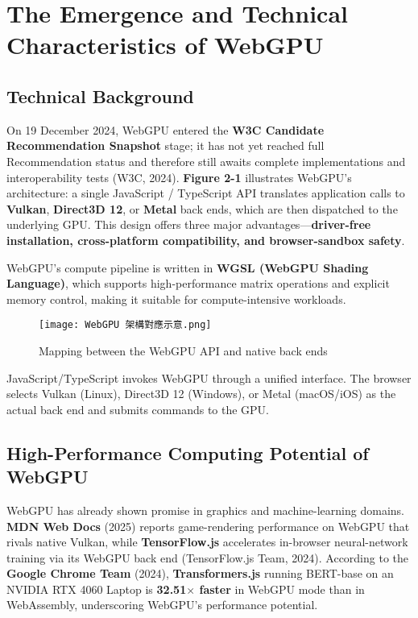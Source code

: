 \documentclass[PhD]{PHlab-thesis}
\begin{document}
\section{The Emergence and Technical Characteristics of WebGPU}
\subsection{Technical Background}
On 19 December 2024, WebGPU entered the \textbf{W3C Candidate Recommendation Snapshot} stage; it has not yet reached full Recommendation status and therefore still awaits complete implementations and interoperability tests (W3C, 2024). \textbf{Figure 2-1} illustrates WebGPU’s architecture: a single JavaScript / TypeScript API translates application calls to \textbf{Vulkan}, \textbf{Direct3D 12}, or \textbf{Metal} back ends, which are then dispatched to the underlying GPU. This design offers three major advantages—\textbf{driver-free installation, cross-platform compatibility, and browser-sandbox safety}.

WebGPU’s compute pipeline is written in \textbf{WGSL (WebGPU Shading Language)}, which supports high-performance matrix operations and explicit memory control, making it suitable for compute-intensive workloads.

\begin{figure}[htbp]
    \centering
    \texttt{[image: WebGPU 架構對應示意.png]}
    \caption{Mapping between the WebGPU API and native back ends}
    \label{fig:webgpu-mapping}
\end{figure}

JavaScript/TypeScript invokes WebGPU through a unified interface. The browser selects Vulkan (Linux), Direct3D 12 (Windows), or Metal (macOS/iOS) as the actual back end and submits commands to the GPU.

\subsection{High-Performance Computing Potential of WebGPU}
WebGPU has already shown promise in graphics and machine-learning domains. \textbf{MDN Web Docs} (2025) reports game-rendering performance on WebGPU that rivals native Vulkan, while \textbf{TensorFlow.js} accelerates in-browser neural-network training via its WebGPU back end (TensorFlow.js Team, 2024). According to the \textbf{Google Chrome Team} (2024), \textbf{Transformers.js} running BERT-base on an NVIDIA RTX 4060 Laptop is \textbf{32.51$\times$ faster} in WebGPU mode than in WebAssembly, underscoring WebGPU’s performance potential.
\end{document}
